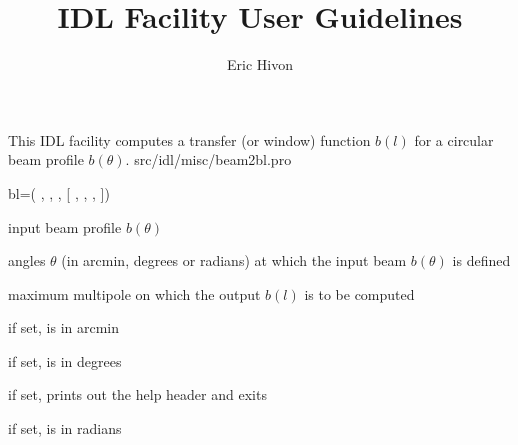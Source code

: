 

\sloppy

\title{\healpix IDL Facility User Guidelines}
 \section[beam2bl]{ }
\label{idl:beam2bl}
\author{Eric Hivon}

\begin{facility}
{This IDL facility computes a transfer (or window) function $b(l)$ for a circular beam profile $b(\theta)$.
}
{src/idl/misc/beam2bl.pro}
\end{facility}

\begin{IDLformat}
{%
{bl}=\thedocid(
, 
, 
, 
[%
 ,
, 
, 
%
])}
\end{IDLformat}

\begin{qualifiers}
  \begin{qulist}{} %
    \item[beam] %
      input beam profile $b(\theta)$ 
    \item[theta] %
    angles $\theta$ (in arcmin, degrees or radians) 
  at which the input beam $b(\theta)$ is defined
    \item[lmax] %
    maximum multipole on which the output $b(l)$ is to be computed
  \end{qulist}
\end{qualifiers}

\begin{keywords}
  \begin{kwlist}{} %
    \item[/ARCMIN] %
	if set,  is in arcmin
    \item[/DEGREES] %
	if set,  is in degrees
    \item[/HELP] %
	if set, prints out the help header and exits
    \item[/RADIANS] %
	if set,  is in radians
  \end{kwlist}
\end{keywords}  

